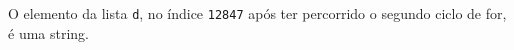 \documentclass[12pt,varwidth=16cm,border=1pt]{standalone}
\begin{document}
O elemento da lista \verb+d+, no índice \verb+12847+ após ter percorrido o segundo ciclo de for, é uma string.

\questiomtrue
\end{document}
